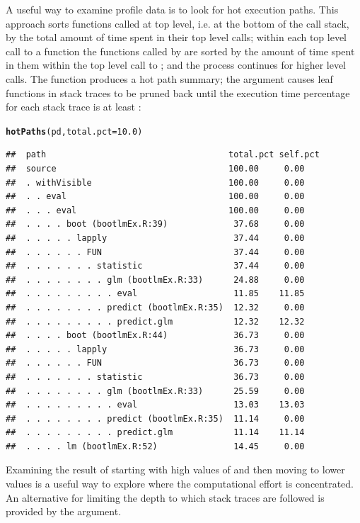 \documentclass[nojss]{jss}\usepackage[]{graphicx}\usepackage[]{color}
\makeatletter
\newcommand{\hlnum}[1]{\textcolor[rgb]{0.686,0.059,0.569}{#1}}%
\newcommand{\hlstd}[1]{\textcolor[rgb]{0.345,0.345,0.345}{#1}}%
\newcommand{\hlkwc}[1]{\textcolor[rgb]{0.333,0.667,0.333}{#1}}%
\newcommand{\hlkwd}[1]{\textcolor[rgb]{0.737,0.353,0.396}{\textbf{#1}}}%
\newenvironment{kframe}{%
 \def\at@end@of@kframe{}%
 \ifinner\ifhmode%
  \def\at@end@of@kframe{\end{minipage}}%
  \begin{minipage}{\columnwidth}%
 \fi\fi%
 \def\FrameCommand##1{\hskip\@totalleftmargin \hskip-\fboxsep
 \colorbox{shadecolor}{##1}\hskip-\fboxsep
     \hskip-\linewidth \hskip-\@totalleftmargin \hskip\columnwidth}%
 \MakeFramed {\advance\hsize-\width
   \@totalleftmargin\z@ \linewidth\hsize
   \@setminipage}}%
 {\par\unskip\endMakeFramed%
 \at@end@of@kframe}
\newenvironment{knitrout}{}{} %
\makeatother
\begin{document}
A useful way to examine profile data is to look for hot execution
paths.  This approach sorts functions called at top level, i.e. at the
bottom of the call stack, by the total amount of time spent in their
top level calls; within each top level call to a function  the
functions called by  are sorted by the amount of time spent in
them within the top level call to ; and the process continues
for higher level calls. The function  produces a hot
path summary; the  argument causes leaf functions in
stack traces to be pruned back until the execution time percentage for
each stack trace is at least :
\begin{knitrout}\small
{}\color{fgcolor}\begin{kframe}
\begin{alltt}
\hlkwd{hotPaths}\hlstd{(pd,} \hlkwc{total.pct} \hlstd{=} \hlnum{10.0}\hlstd{)}
\end{alltt}
\begin{verbatim}
##  path                                    total.pct self.pct
##  source                                  100.00     0.00   
##  . withVisible                           100.00     0.00   
##  . . eval                                100.00     0.00   
##  . . . eval                              100.00     0.00   
##  . . . . boot (bootlmEx.R:39)             37.68     0.00   
##  . . . . . lapply                         37.44     0.00   
##  . . . . . . FUN                          37.44     0.00   
##  . . . . . . . statistic                  37.44     0.00   
##  . . . . . . . . glm (bootlmEx.R:33)      24.88     0.00   
##  . . . . . . . . . eval                   11.85    11.85   
##  . . . . . . . . predict (bootlmEx.R:35)  12.32     0.00   
##  . . . . . . . . . predict.glm            12.32    12.32   
##  . . . . boot (bootlmEx.R:44)             36.73     0.00   
##  . . . . . lapply                         36.73     0.00   
##  . . . . . . FUN                          36.73     0.00   
##  . . . . . . . statistic                  36.73     0.00   
##  . . . . . . . . glm (bootlmEx.R:33)      25.59     0.00   
##  . . . . . . . . . eval                   13.03    13.03   
##  . . . . . . . . predict (bootlmEx.R:35)  11.14     0.00   
##  . . . . . . . . . predict.glm            11.14    11.14   
##  . . . . lm (bootlmEx.R:52)               14.45     0.00
\end{verbatim}
\end{kframe}
\end{knitrout}
Examining the result of  starting with high values of
 and then moving to lower values is a useful way to
explore where the computational effort is concentrated.  An alternative
for limiting the depth to which stack traces are followed is provided
by the  argument.
\end{document}
